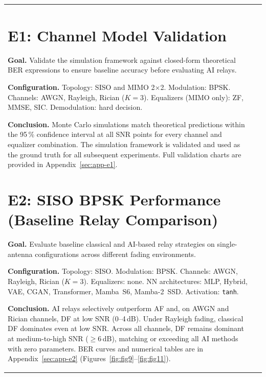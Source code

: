 {\begin{longtable}[]{@{}ll@{}}
\section{E1: Channel Model Validation}\label{sec:channel-model-validation}

\textbf{Goal.}
Validate the simulation framework against closed-form theoretical BER expressions to
ensure baseline accuracy before evaluating AI relays.

\textbf{Configuration.}
Topology: SISO and MIMO 2$\times$2.
Modulation: BPSK.
Channels: AWGN, Rayleigh, Rician ($K{=}3$).
Equalizers (MIMO only): ZF, MMSE, SIC.
Demodulation: hard decision.

\textbf{Conclusion.}
Monte Carlo simulations match theoretical predictions within the 95\,\% confidence
interval at all SNR points for every channel and equalizer combination.
The simulation framework is validated and used as the ground truth for all subsequent
experiments.
Full validation charts are provided in Appendix~\ref{sec:app-e1}.

\section{E2: SISO BPSK Performance (Baseline Relay Comparison)}\label{sec:siso-bpsk-performance-baseline-relay-comparison}

\textbf{Goal.}
Evaluate baseline classical and AI-based relay strategies on single-antenna
configurations across different fading environments.

\textbf{Configuration.}
Topology: SISO.
Modulation: BPSK.
Channels: AWGN, Rayleigh, Rician ($K{=}3$).
Equalizers: none.
NN architectures: MLP, Hybrid, VAE, CGAN, Transformer, Mamba~S6, Mamba-2~SSD.
Activation: \texttt{tanh}.

\textbf{Conclusion.}
AI relays selectively outperform AF and, on AWGN and Rician channels, DF at low SNR
(0--4\,dB).
Under Rayleigh fading, classical DF dominates even at low SNR.
Across all channels, DF remains dominant at medium-to-high SNR ($\geq 6$\,dB),
matching or exceeding all AI methods with zero parameters.
BER curves and numerical tables are in Appendix~\ref{sec:app-e2}
(Figures~\ref{fig:fig9}--\ref{fig:fig11}).


\end{longtable}}
